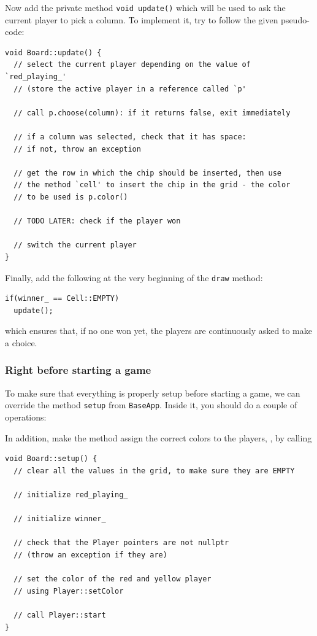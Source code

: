 \documentclass{article}
\begin{document}
Now add the private method \texttt{void update()} which will be used to ask the current player to pick a column. To implement it, try to follow the given pseudo-code:
\begin{lstlisting}[style=mycpp,numbers=none]
void Board::update() {
  // select the current player depending on the value of `red_playing_'
  // (store the active player in a reference called `p'
  
  // call p.choose(column): if it returns false, exit immediately
  
  // if a column was selected, check that it has space:
  // if not, throw an exception
  
  // get the row in which the chip should be inserted, then use
  // the method `cell' to insert the chip in the grid - the color
  // to be used is p.color()
  
  // TODO LATER: check if the player won
  
  // switch the current player
}
\end{lstlisting}

Finally, add the following at the very beginning of the \texttt{draw} method:
\begin{lstlisting}[style=mycpp,numbers=none]
if(winner_ == Cell::EMPTY)
  update();
\end{lstlisting}
which ensures that, if no one won yet, the players are continuously asked to make a choice.




\subsubsection{Right before starting a game}

To make sure that everything is properly setup before starting a game, we can override the method \texttt{setup} from \texttt{BaseApp}. Inside it, you should do a couple of operations:

In addition, make the method assign the correct colors to the players, \eg, by calling
\begin{lstlisting}[style=mycpp,numbers=none]
void Board::setup() {
  // clear all the values in the grid, to make sure they are EMPTY
  
  // initialize red_playing_
  
  // initialize winner_
  
  // check that the Player pointers are not nullptr
  // (throw an exception if they are)
  
  // set the color of the red and yellow player
  // using Player::setColor
  
  // call Player::start
}
\end{lstlisting}
\end{document}
